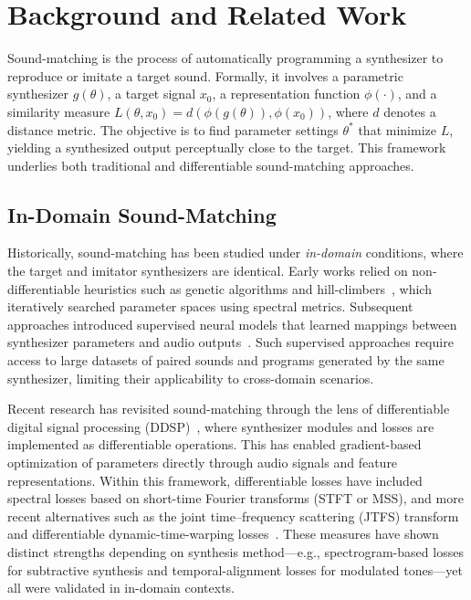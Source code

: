 \documentclass[14pt]{extarticle} %
\begin{document}
\section{Background and Related Work}
\label{sec:background}

Sound-matching is the process of automatically programming a synthesizer to reproduce or imitate a target sound.  
Formally, it involves a parametric synthesizer $g(\theta)$, a target signal $x_0$, a representation function $\phi(\cdot)$, and a similarity measure $L(\theta, x_0) = d(\phi(g(\theta)), \phi(x_0))$, where $d$ denotes a distance metric.  
The objective is to find parameter settings $\theta^*$ that minimize $L$, yielding a synthesized output perceptually close to the target.  
This framework underlies both traditional and differentiable sound-matching approaches.

\subsection{In-Domain Sound-Matching}
Historically, sound-matching has been studied under \emph{in-domain} conditions, where the target and imitator synthesizers are identical.  
Early works relied on non-differentiable heuristics such as genetic algorithms and hill-climbers~\cite{horner1993machine,mitchell2007evolutionary}, which iteratively searched parameter spaces using spectral metrics.  
Subsequent approaches introduced supervised neural models that learned mappings between synthesizer parameters and audio outputs~\cite{yee2018automatic,esling2019flow,masuda2021soundmatch}. Such supervised approaches require access to large datasets of paired sounds and programs generated by the same synthesizer, limiting their applicability to cross-domain scenarios.

Recent research has revisited sound-matching through the lens of differentiable digital signal processing (DDSP)~\cite{engel2020ddsp}, where synthesizer modules and losses are implemented as differentiable operations.  
This has enabled gradient-based optimization of parameters directly through audio signals and feature representations.  
Within this framework, differentiable losses have included spectral losses based on short-time Fourier transforms (STFT or MSS), and more recent alternatives such as the joint time–frequency scattering (JTFS) transform~\cite{vahidi2023mesostructures} and differentiable dynamic-time-warping losses~\cite{salimi2025evaluating}.  
These measures have shown distinct strengths depending on synthesis method—e.g., spectrogram-based losses for subtractive synthesis and temporal-alignment losses for modulated tones—yet all were validated in in-domain contexts.
\end{document}
